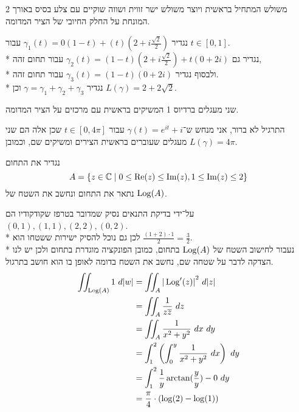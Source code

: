 \subquestion{}
משולש המתחיל בראשית ויוצר משולש ישר זווית ושווה שוקיים עם צלע בסיס באורך 2 המונחת על החלק החיובי של הציר המדומה.
\begin{solution}
	נגדיר $\gamma_1(t) = 0(1 - t) + (t)(2 + i \frac{\sqrt{2}}{2})$ עבור $t \in [0, 1]$. \\*
	נגדיר גם $\gamma_2(t) = (1  - t)(2 + i \frac{\sqrt{2}}{2}) + t (0 + 2i)$ עבור תחום זהה, \\*
	ולבסוף נגדיר $\gamma_3(t) = (1 - t) (0 + 2i)$ עבור תחום זהה. \\*
	נגדיר $\gamma = \gamma_1 + \gamma_2 + \gamma_3$ וכן $L(\gamma) = 2 + 2 \sqrt{2}$.
\end{solution}

\subquestion{}
שני מעגלים ברדיוס 1 המשיקים בראשית עם מרכזים על הציר המדומה.
\begin{solution}
	התרגיל לא ברור, אני מנחש ש־$\gamma(t) = e^{it} + i$ עבור $t \in [0, 4\pi]$ שכן אלה הם שני מעגלים שעוברים בראשית הצירים ומשיקים שם, וכמובן $L(\gamma) = 4\pi$.
\end{solution}

\question{}
נגדיר את התחום
\[
	A = \{z \in \mathbb{C} \mid 0 \le \operatorname{Re}(z) \le \operatorname{Im}(z), 1 \le \operatorname{Im}(z) \le 2\}
\]
נתאר את התחום ונחשב את השטח של $\operatorname{Log}(A)$.
\begin{solution}
	על־ידי בדיקת התנאים נסיק שמדובר בטרפז שקודקודיו הם $(0, 1), (1, 1), (2, 2), (0, 2)$. \\*
	לכן גם נוכל להסיק ישירות ששטחו הוא $\frac{(1 + 2) \cdot 1}{2} = \frac{3}{2}$. \\*
	נעבור לחישוב השטח של $\operatorname{Log}(A)$ בתחום, כמובן הפונקציה מוגדרת בתחום ולכן יש לנו הצדקה לדבר על שטחה שם, נחשב את השטח בדומה לאופן בו הוא חושב בתרגול.
	\begin{align*}
		\iint_{\Log(A)} 1\ d|w|
		& = \iint_A {|\Log'(z)|}^2\ d|z| \\
		& = \iint_A \frac{1}{z \overline{z}}\ dz \\
		& = \iint_A \frac{1}{x^2 + y^2}\ dx\ dy \\
		& = \int_1^2 \left(\int_0^y \frac{1}{x^2 + y^2}\ dx\right)\ dy \\
		& = \int_1^2 \frac{1}{y} \arctan(\frac{y}{y}) - 0\ dy \\
		& = \frac{\pi}{4} \cdot (\log(2) - \log(1))
	\end{align*}
\end{solution}

